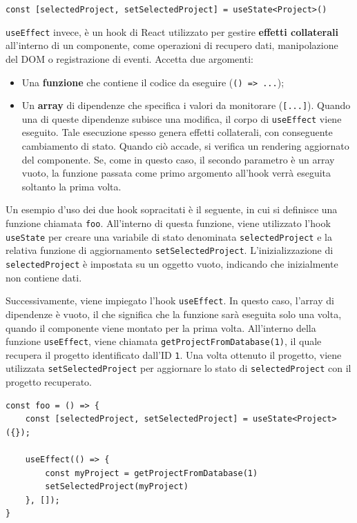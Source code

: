 \documentclass[target=bach,aauheader=,style=]{thud}
\begin{document}
\begin{center}
\texttt{const [selectedProject, setSelectedProject] = useState<Project>({})}
\end{center}

\noindent \texttt{useEffect} invece, è un hook di React utilizzato per gestire \textbf{effetti collaterali} all'interno di un componente, come operazioni di recupero dati, manipolazione del DOM o registrazione di eventi. Accetta due argomenti: 

\begin{itemize}
    \item Una \textbf{funzione} che contiene il codice da eseguire (\texttt{() => {...}});
    \item Un \textbf{array} di dipendenze che specifica i valori da monitorare (\texttt{[...]}). Quando una di queste dipendenze subisce una modifica, il corpo di \texttt{useEffect} viene eseguito. Tale esecuzione spesso genera effetti collaterali, con conseguente cambiamento di stato. Quando ciò accade, si verifica un rendering aggiornato del componente. Se, come in questo caso, il secondo parametro è un array vuoto, la funzione passata come primo argomento all'hook verrà eseguita soltanto la prima volta.
\end{itemize}

\noindent Un esempio d'uso dei due hook sopracitati è il seguente, in cui si definisce una funzione chiamata \texttt{foo}. All'interno di questa funzione, viene utilizzato l'hook \texttt{useState} per creare una variabile di stato denominata \texttt{selectedProject} e la relativa funzione di aggiornamento \texttt{setSelectedProject}. L'inizializzazione di \texttt{selectedProject} è impostata su un oggetto vuoto, indicando che inizialmente non contiene dati.

\noindent Successivamente, viene impiegato l'hook \texttt{useEffect}. In questo caso, l'array di dipendenze è vuoto, il che significa che la funzione sarà eseguita solo una volta, quando il componente viene montato per la prima volta. All'interno della funzione \texttt{useEffect}, viene chiamata \texttt{getProjectFromDatabase(1)}, il quale recupera il progetto identificato dall'ID \texttt{1}. Una volta ottenuto il progetto, viene utilizzata \texttt{setSelectedProject} per aggiornare lo stato di \texttt{selectedProject} con il progetto recuperato.

\begin{lstlisting}[caption=\texttt{useEffect} e \texttt{useState} per ottenere e salvare un progetto in uno stato locale]
const foo = () => {
    const [selectedProject, setSelectedProject] = useState<Project>({});

    useEffect(() => {
        const myProject = getProjectFromDatabase(1)
        setSelectedProject(myProject)
    }, []);
}
\end{lstlisting}
\end{document}
